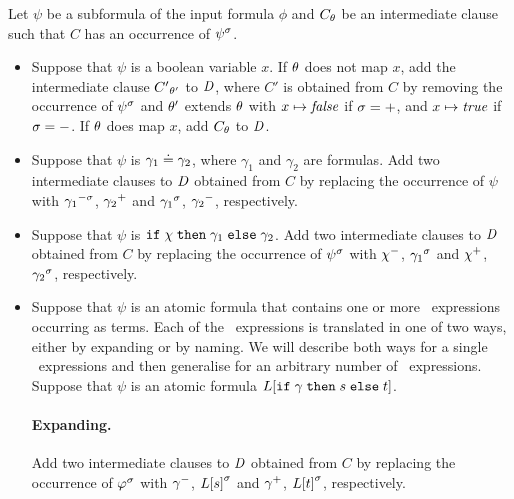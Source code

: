 Let $\psi$ be a subformula of the input formula $\phi$ and ${C}_{\theta}$ be an intermediate clause such that $C$ has an occurrence of ${\psi}^{\sigma}$.
\begin{itemize}
  \item
    Suppose that $\psi$ is a boolean variable $x$. If $\theta$ does not map $x$, add the intermediate clause ${C'}_{\theta'}$ to $\mathit{D}$, where $C'$ is obtained from $C$ by removing the occurrence of ${\psi}^{\sigma}$ and $\theta'$ extends $\theta$ with $x \mapsto \mathit{false}$ if $\sigma=+$, and $x \mapsto \mathit{true}$ if $\sigma=-$. If $\theta$ does map $x$, add ${C}_{\theta}$ to $\mathit{D}$. 

  \item
    Suppose that $\psi$ is $\gamma_1 \doteq \gamma_2$, where $\gamma_1$ and $\gamma_2$ are formulas. Add two intermediate clauses to $\mathit{D}$ obtained from $C$ by replacing the occurrence of $\psi$ with ${\gamma_1}^{-\sigma}$, ${\gamma_2}^{+}$ and ${\gamma_1}^{\sigma}$, ${\gamma_2}^{-}$, respectively.

  \item
    Suppose that $\psi$ is $\mathtt{if}\;{\chi}\;\allowbreak\mathtt{then}\;{\gamma_1}\;\allowbreak\mathtt{else}\;{\gamma_2}$. Add two intermediate clauses to $\mathit{D}$ obtained from $C$ by replacing the occurrence of ${\psi}^{\sigma}$ with ${\chi}^{-}$, ${\gamma_1}^{\sigma}$ and ${\chi}^{+}$, ${\gamma_2}^{\sigma}$, respectively.

  \item
    Suppose that $\psi$ is an atomic formula that contains one or more \ITE\ expressions occurring as terms. Each of the \ITE\ expressions is translated in one of two ways, either by expanding or by naming. We will describe both ways for a single \ITE\ expressions and then generalise for an arbitrary number of \ITE\ expressions. Suppose that $\psi$ is an atomic formula $L[\mathtt{if}\;{\gamma}\;\allowbreak\mathtt{then}\;{s}\;\allowbreak\mathtt{else}\;{t}]$.

    \paragraph{Expanding.} Add two intermediate clauses to $\mathit{D}$ obtained from $C$ by replacing the occurrence of ${\varphi}^{\sigma}$ with ${\gamma}^{-}$, ${L[s]}^{\sigma}$ and ${\gamma}^{+}$, ${L[t]}^{\sigma}$, respectively.
    

\end{itemize}

